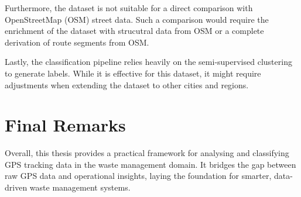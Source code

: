 \documentclass[a4paper,12pt,twoside]{scrreprt}
\begin{document}
Furthermore, the dataset is not suitable for a direct comparison with
OpenStreetMap (OSM) street data. Such a comparison would require the enrichment
of the dataset with strucutral data from OSM or a complete derivation of route
segments from OSM.

Lastly, the classification pipeline relies heavily on the semi-supervised
clustering
to generate labels. While it is effective for this dataset, it might require
adjustments
when extending the dataset to other cities and regions.

\section{Final Remarks}
Overall, this thesis provides a practical framework for analysing and
classifying GPS tracking data in the waste management domain. It bridges the
gap between raw GPS data and operational insights,
laying the foundation for smarter, data-driven waste management systems.

\clearpage
{}
{}
\printbibliography



\appendix
\end{document}
